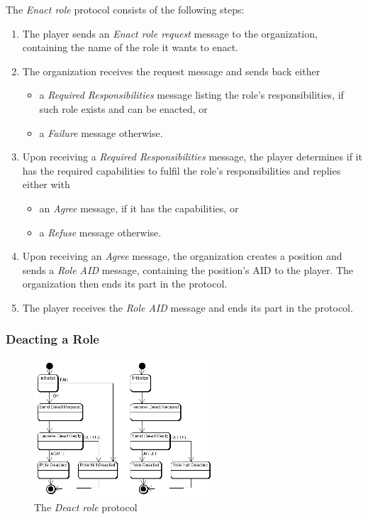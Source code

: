 The \textit{Enact role} protocol consists of the following steps:
\begin{enumerate}
	\item The player sends an \textit{Enact role request} message to the organization, containing the name of the role it wants to enact.
	\item The organization receives the request message and sends back either
	\begin{itemize}
		\item a \textit{Required Responsibilities} message listing the role's responsibilities, if such role exists and can be enacted, or
		\item a \textit{Failure} message otherwise.
	\end{itemize}
	\item Upon receiving a \textit{Required Responsibilities} message, the player determines if it has the required capabilities to fulfil the role's responsibilities and replies either with
	\begin{itemize}
		\item an \textit{Agree} message, if it has the capabilities, or
		\item a \textit{Refuse} message otherwise.
	\end{itemize}
	\item Upon receiving an \textit{Agree} message, the organization creates a position and sends a \textit{Role AID} message, containing the position's AID to the player.
	The organization then ends its part in the protocol.
	\item The player receives the \textit{Role AID} message and ends its part in the protocol.
\end{enumerate}


\subsubsection{Deacting a Role}

\begin{figure}[ht]
	\centering
	\includegraphics[width=0.6\textwidth]{images/thespian/deact-role-protocol.png}
	\caption{The \textit{Deact role} protocol}
	\label{figure:thespian-deact-role-protocol}
\end{figure}

